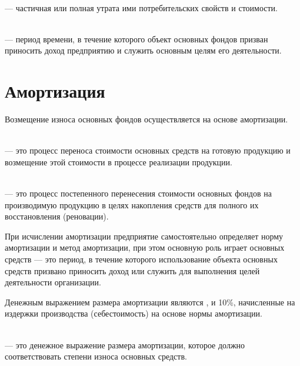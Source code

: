 \begin{definition}
    \normalfont
    ~\\
     --- частичная или полная утрата ими
    потребительских свойств и стоимости.
\end{definition}

\begin{definition}
    \normalfont
    ~\\
     --- период времени, в
    течение которого объект основных фондов призван приносить доход предприятию
    и служить основным целям его деятельности.
\end{definition}


\section{Амортизация}

Возмещение износа основных фондов осуществляется на основе амортизации.

\begin{definition}
    \normalfont
    ~\\
     --- это процесс переноса стоимости основных средств на
    готовую продукцию и возмещение этой стоимости в процессе реализации
    продукции.
\end{definition}

\begin{definition}
    \normalfont
    ~\\
     --- это процесс постепенного перенесения стоимости
    основных фондов на производимую продукцию в целях накопления средств для
    полного их восстановления (реновации).
\end{definition}

При исчислении амортизации предприятие самостоятельно определяет норму
амортизации и метод амортизации, при этом основную роль играет  основных средств --- это период, в течение которого
использование объекта основных средств призвано приносить доход или служить для
выполнения целей деятельности организации.

Денежным выражением размера амортизации являются
, и 10\%, начисленные на издержки
производства (себестоимость) на основе нормы амортизации.

\begin{definition}
    \normalfont
    ~\\
     --- это денежное выражение размера
    амортизации, которое должно соответствовать степени износа основных средств.
\end{definition}

